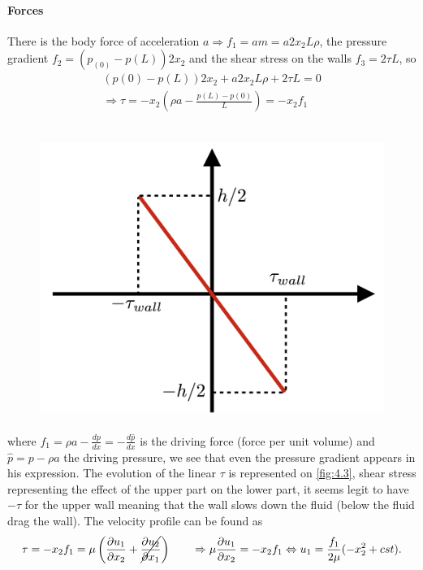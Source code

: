 		\paragraph{Forces} There is the body force of acceleration $a \Rightarrow f_1 = am = a 2x_2 L \rho$, the pressure gradient $f_2 = (p_(0)-p(L))2x_2$ and the shear stress on the walls $f_3 = 2\tau L$, so
		\begin{equation}
		\begin{aligned}
			(p(0)-p(L))2x_2 +  a 2x_2 L \rho + 2\tau L = 0 \\
			\Rightarrow \tau = -x_2 \left( \rho a - \frac{p(L)-p(0)}{L}\right) = -x_2 f_1
		\end{aligned}
		\end{equation}
		\ \\
			
		\begin{figure}
		\vspace{-15mm}
		\includegraphics[scale=0.2]{ch4/3}
		\label{fig:4.3}
		\end{figure}
		where $f_1 = \rho a - \frac{dp}{dx} = -\frac{d\hat{p}}{dx}$ is the driving force (force per unit volume) and $\hat{p} = p - \rho a$ the driving pressure, we see that even the pressure gradient appears in his expression. The evolution of the linear $\tau$ is represented on \autoref{fig:4.3}, shear stress representing the effect of the upper part on the lower part, it seems legit to have $-\tau$ for the upper wall meaning that the wall slows down the fluid (below the fluid drag the wall). The velocity profile can be found as 
		\begin{equation}
			\tau = -x_2 f_1 = \mu \left( \frac{\partial u_1}{\partial x_2}+ \cancel{\frac{\partial u_2}{\partial x_1}}\right) \qquad \Rightarrow \mu \frac{\partial u_1}{\partial x_2} = -x_2 f_1 \Leftrightarrow u_1 = \frac{f_1}{2\mu} (-x_2^2+cst).
		\end{equation}
		
